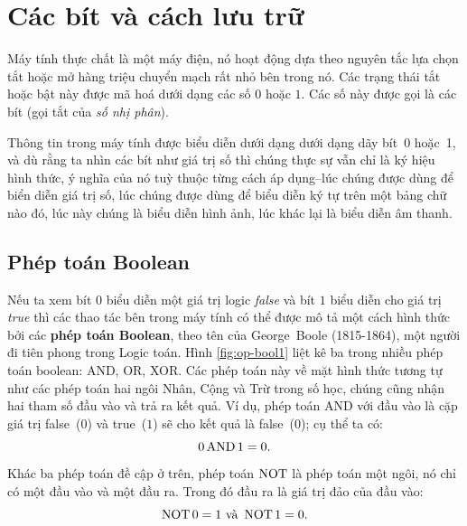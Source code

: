 \section{Các bít và cách lưu trữ}

Máy tính thực chất là một máy điện, nó hoạt động dựa theo nguyên tắc lựa chọn tắt hoặc mở
hàng triệu chuyển mạch rất nhỏ bên trong nó. Các trạng thái tắt hoặc bật này được mã hoá
dưới dạng các số $0$ hoặc $1$. Các số này được gọi là các bít (gọi tắt của \textit{số nhị
  phân}).


Thông tin trong máy tính được biểu diễn dưới dạng dưới dạng dãy bít~0 hoặc~1, và dù rằng
ta nhìn các bít như giá trị số thì chúng thực sự vẫn chỉ là ký hiệu hình thức, ý nghĩa của
nó tuỳ thuộc từng cách áp dụng--lúc chúng được dùng để biển diễn giá trị số, lúc chúng
được dùng để biểu diễn ký tự trên một bảng chữ nào đó, lúc này chúng là biểu diễn hình
ảnh, lúc khác lại là biểu diễn âm thanh.

\subsection*{Phép toán Boolean}

Nếu ta xem bít $0$ biểu diễn một giá trị logic \textit{false} và bít $1$ biểu diễn cho giá
trị \textit{true} thì các thao tác bên trong máy tính có thể được mô tả một cách hình thức
bởi các \textbf{phép toán Boolean}, theo tên của George~Boole (1815-1864), một người đi
tiên phong trong Logic toán. Hình  \ref{fig:op-bool1} liệt kê ba trong nhiều phép toán
boolean: AND, OR, XOR. Các phép toán này về mặt hình thức tương tự như các phép toán hai
ngôi Nhân, Cộng và Trừ trong số học, chúng cũng nhận hai tham số đầu vào và trả ra kết
quả. Ví dụ, phép toán AND với đầu vào là cặp giá trị false~($0$) và true~($1$) sẽ cho kết
quả là false~($0$); cụ thể ta có:
\[
  0 \operatorname{\mbox{AND}} 1 = 0.
\] 
Khác ba phép toán đề cập ở trên, phép toán $\operatorname{\mbox{NOT}}$ là phép toán một ngôi, nó chỉ có một đầu
vào và một đầu ra. Trong đó đầu ra là giá trị đảo của đầu vào:
\[
\operatorname{\mbox{NOT}}  0 = 1 \mbox{ và } \operatorname{\mbox{NOT}} 1 = 0.
\]

